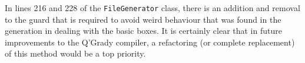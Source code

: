 \documentclass[report.tex]{subfiles}
\begin{document}
In lines 216 and 228 of the \texttt{FileGenerator} class,  there is an addition
and removal to the guard that is required to avoid weird behaviour that was
found in the generation in dealing with the basic boxes. It is certainly clear
that in future improvements to the Q'Grady compiler, a refactoring (or complete
replacement) of this method would be a top priority.

\newpage
\end{document}
